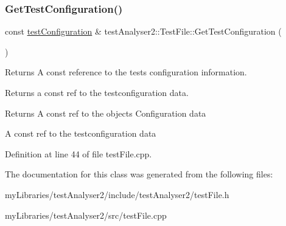 \subsubsection{\texorpdfstring{GetTestConfiguration()}{GetTestConfiguration()}}
{\footnotesize\ttfamily const \mbox{\hyperlink{structtestAnalyser2_1_1testConfiguration}{test\+Configuration}} \& test\+Analyser2\+::\+Test\+File\+::\+Get\+Test\+Configuration (\begin{DoxyParamCaption}{ }\end{DoxyParamCaption})}



Returns A const reference to the tests configuration information. 

Returns a const ref to the testconfiguration data.

\begin{DoxyReturn}{Returns}
A const ref to the object\textquotesingle{}s Configuration data

A const ref to the testconfiguration data 
\end{DoxyReturn}


Definition at line 44 of file test\+File.\+cpp.



The documentation for this class was generated from the following files\+:\begin{DoxyCompactItemize}
\item 
my\+Libraries/test\+Analyser2/include/test\+Analyser2/test\+File.\+h\item 
my\+Libraries/test\+Analyser2/src/test\+File.\+cpp\end{DoxyCompactItemize}
